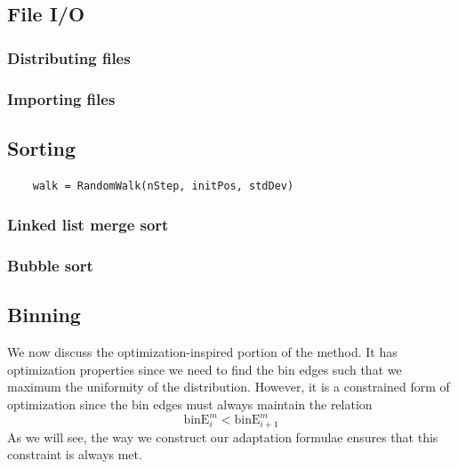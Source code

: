 \documentclass{article}
\begin{document}
\subsection{File I/O}




\subsubsection{Distributing files}



\subsubsection{Importing files}




\subsection{Sorting}

\begin{lstlisting}
	walk = RandomWalk(nStep, initPos, stdDev)
\end{lstlisting}

\subsubsection{Linked list merge sort}
\subsubsection{Bubble sort}


\subsection{Binning}
We now discuss the optimization-inspired portion of the method. It has optimization properties since we need to find the bin edges such that we maximum the uniformity of the distribution. However, it is a constrained form of optimization since the bin edges must always maintain the relation
\begin{equation}
	\textrm{binE}^m_i < \textrm{binE}^m_{i+1}
\end{equation}
As we will see, the way we construct our adaptation formulae ensures that this constraint is always met.
\end{document}
